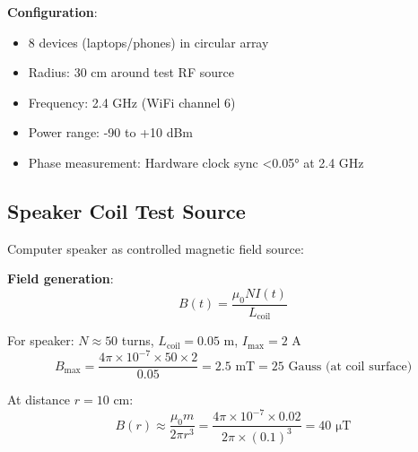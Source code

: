 \documentclass[12pt,a4paper]{article}
\begin{document}
\textbf{Configuration}:
\begin{itemize}
\item 8 devices (laptops/phones) in circular array
\item Radius: 30 cm around test RF source
\item Frequency: 2.4 GHz (WiFi channel 6)
\item Power range: -90 to +10 dBm
\item Phase measurement: Hardware clock sync <0.05° at 2.4 GHz
\end{itemize}

\subsection{Speaker Coil Test Source}

Computer speaker as controlled magnetic field source:

\begin{center}
\end{center}

\textbf{Field generation}:
\begin{equation}
B(t) = \frac{\mu_0 N I(t)}{L_{\text{coil}}}
\end{equation}

For speaker: $N \approx 50$ turns, $L_{\text{coil}} = 0.05$ m, $I_{\text{max}} = 2$ A
\begin{equation}
B_{\text{max}} = \frac{4\pi \times 10^{-7} \times 50 \times 2}{0.05} = 2.5 \text{ mT} = 25 \text{ Gauss (at coil surface)}
\end{equation}

At distance $r = 10$ cm:
\begin{equation}
B(r) \approx \frac{\mu_0 m}{2\pi r^3} = \frac{4\pi \times 10^{-7} \times 0.02}{2\pi \times (0.1)^3} = 40 \text{ μT}
\end{equation}
\end{document}
